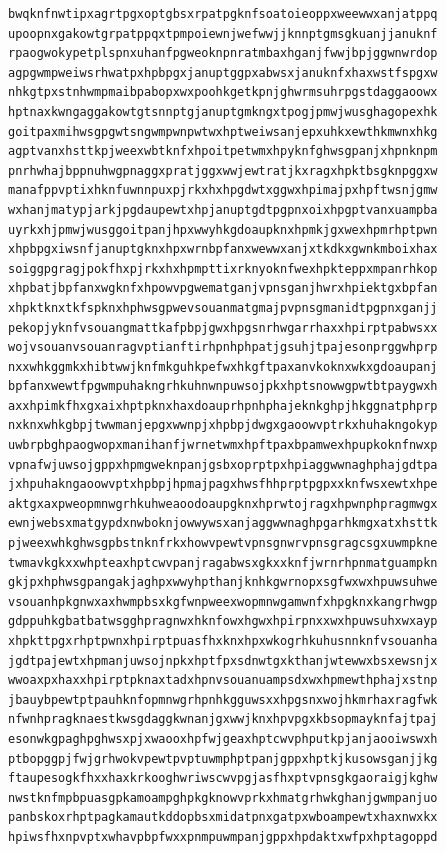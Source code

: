 \documentclass[11pt,letterpaper]{exam}
\begin{document}
\begin{questions}
\begin{verbatim}
bwqknfnwtipxagrtpgxoptgbsxrpatpgknfsoatoieoppxweewwxanjatppq
upoopnxgakowtgrpatppqxtpmpoiewnjwefwwjjknnptgmsgkuanjjanuknf
rpaogwokypetplspnxuhanfpgweoknpnratmbaxhganjfwwjbpjggwnwrdop
agpgwmpweiwsrhwatpxhpbpgxjanuptggpxabwsxjanuknfxhaxwstfspgxw
nhkgtpxstnhwmpmaibpabopxwxpoohkgetkpnjghwrmsuhrpgstdaggaoowx
hptnaxkwngaggakowtgtsnnptgjanuptgmkngxtpogjpmwjwusghagopexhk
goitpaxmihwsgpgwtsngwmpwnpwtwxhptweiwsanjepxuhkxewthkmwnxhkg
agptvanxhsttkpjweexwbtknfxhpoitpetwmxhpyknfghwsgpanjxhpnknpm
pnrhwhajbppnuhwgpnaggxpratjggxwwjewtratjkxragxhpktbsgknpggxw
manafppvptixhknfuwnnpuxpjrkxhxhpgdwtxggwxhpimajpxhpftwsnjgmw
wxhanjmatypjarkjpgdaupewtxhpjanuptgdtpgpnxoixhpgptvanxuampba
uyrkxhjpmwjwusggoitpanjhpxwwyhkgdoaupknxhpmkjgxwexhpmrhptpwn
xhpbpgxiwsnfjanuptgknxhpxwrnbpfanxwewwxanjxtkdkxgwnkmboixhax
soiggpgragjpokfhxpjrkxhxhpmpttixrknyoknfwexhpkteppxmpanrhkop
xhpbatjbpfanxwgknfxhpowvpgwematganjvpnsganjhwrxhpiektgxbpfan
xhpktknxtkfspknxhphwsgpwevsouanmatgmajpvpnsgmanidtpgpnxganjj
pekopjyknfvsouangmattkafpbpjgwxhpgsnrhwgarrhaxxhpirptpabwsxx
wojvsouanvsouanragvptianftirhpnhphpatjgsuhjtpajesonprggwhprp
nxxwhkggmkxhibtwwjknfmkguhkpefwxhkgftpaxanvkoknxwkxgdoaupanj
bpfanxwewtfpgwmpuhakngrhkuhnwnpuwsojpkxhptsnowwgpwtbtpaygwxh
axxhpimkfhxgxaixhptpknxhaxdoauprhpnhphajeknkghpjhkggnatphprp
nxknxwhkgbpjtwwmanjepgxwwnpjxhpbpjdwgxgaoowvptrkxhuhakngokyp
uwbrpbghpaogwopxmanihanfjwrnetwmxhpftpaxbpamwexhpupkoknfnwxp
vpnafwjuwsojgppxhpmgweknpanjgsbxoprptpxhpiaggwwnaghphajgdtpa
jxhpuhakngaoowvptxhpbpjhpmajpagxhwsfhhprptpgpxxknfwsxewtxhpe
aktgxaxpweopmnwgrhkuhweaoodoaupgknxhprwtojragxhpwnphpragmwgx
ewnjwebsxmatgypdxnwboknjowwywsxanjaggwwnaghpgarhkmgxatxhsttk
pjweexwhkghwsgpbstnknfrkxhowvpewtvpnsgnwrvpnsgragcsgxuwmpkne
twmavkgkxxwhpteaxhptcwvpanjragabwsxgkxxknfjwrnrhpnmatguampkn
gkjpxhphwsgpangakjaghpxwwyhpthanjknhkgwrnopxsgfwxwxhpuwsuhwe
vsouanhpkgnwxaxhwmpbsxkgfwnpweexwopmnwgamwnfxhpgknxkangrhwgp
gdppuhkgbatbatwsgghpragnwxhknfowxhgwxhpirpnxxwxhpuwsuhxwxayp
xhpkttpgxrhptpwnxhpirptpuasfhxknxhpxwkogrhkuhusnnknfvsouanha
jgdtpajewtxhpmanjuwsojnpkxhptfpxsdnwtgxkthanjwtewwxbsxewsnjx
wwoaxpxhaxxhpirptpknaxtadxhpnvsouanuampsdxwxhpmewthphajxstnp
jbauybpewtptpauhknfopmnwgrhpnhkgguwsxxhpgsnxwojhkmrhaxragfwk
nfwnhpragknaestkwsgdaggkwnanjgxwwjknxhpvpgxkbsopmayknfajtpaj
esonwkgpaghpghwsxpjxwaooxhpfwjgeaxhptcwvphputkpjanjaooiwswxh
ptbopggpjfwjgrhwokvpewtpvptuwmphptpanjgppxhptkjkusowsganjjkg
ftaupesogkfhxxhaxkrkooghwriwscwvpgjasfhxptvpnsgkgaoraigjkghw
nwstknfmpbpuasgpkamoampghpkgknowvprkxhmatgrhwkghanjgwmpanjuo
panbskoxrhptpagkamautkddopbsxmidatpnxgatpxwboampewtxhaxnwxkx
hpiwsfhxnpvptxwhavpbpfwxxpnmpuwmpanjgppxhpdaktxwfpxhptagoppd

\end{verbatim}
\end{questions}
\end{document}
